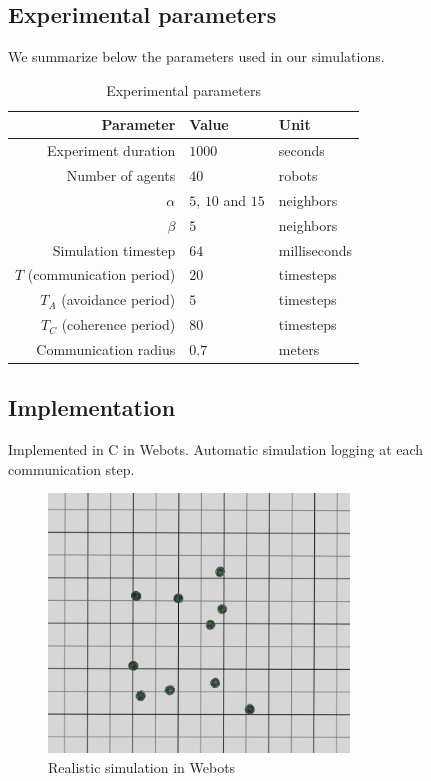 \documentclass[a4paper, 10pt, conference]{ieeeconf}
\begin{document}
  \subsection{Experimental parameters}
  We summarize below the parameters used in our simulations.

  \begin{table}[h]
    \begin{center}
      \begin{tabular}{r|ll}
        \hline
        Parameter                  & Value               & Unit\\
        \hline
        Experiment duration        & $1000$              & seconds\\
        Number of agents           & $40$                & robots\\
        $\alpha$                   & $5$, $10$ and $15$  & neighbors\\
        $\beta$                    & $5$                 & neighbors\\
        Simulation timestep        & $64$                & milliseconds\\
        $T$ (communication period) & $20$                & timesteps\\
        $T_A$ (avoidance period)   & $5$                 & timesteps\\
        $T_C$ (coherence period)   & $80$                & timesteps\\
        Communication radius       & $0.7$               & meters\\
        \hline
      \end{tabular}
      \caption{Experimental parameters}
    \end{center}
  \end{table}

  \subsection{Implementation}
  Implemented in C in Webots. Automatic simulation logging at each communication step.\\

  \begin{figure}[h]
    \begin{center}
      \includegraphics[width=8cm]{figures/swarm-10-screenshot.png}
      \caption{Realistic simulation in Webots}
    \end{center}
  \end{figure}
\end{document}
